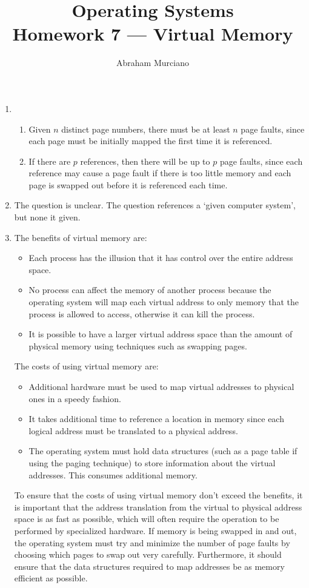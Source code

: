 \documentclass[fleqn]{article}
\title{Operating Systems \\
\medskip
\large Homework 7 --- Virtual Memory}
\author{Abraham Murciano}
\newenvironment{answers}{ %
	\begin{enumerate}
		\setlength{\itemsep}{\bigskipamount}
}{	\end{enumerate}	}
\begin{document}
\maketitle

\begin{answers}
	\item %
	\begin{enumerate}
		\item %
		Given \(n\) distinct page numbers, there must be at least \(n\) page faults, since each page must be initially mapped the first time it is referenced.

		\item %
		If there are \(p\) references, then there will be up to \(p\) page faults, since each reference may cause a page fault if there is too little memory and each page is swapped out before it is referenced each time.
	\end{enumerate}

	\item %
	The question is unclear. The question references a `given computer system', but none it given.

	\item %
	The benefits of virtual memory are:
	\begin{itemize}
		\item Each process has the illusion that it has control over the entire address space.
		\item No process can affect the memory of another process because the operating system will map each virtual address to only memory that the process is allowed to access, otherwise it can kill the process.
		\item It is possible to have a larger virtual address space than the amount of physical memory using techniques such as swapping pages.
	\end{itemize}
	The costs of using virtual memory are:
	\begin{itemize}
		\item Additional hardware must be used to map virtual addresses to physical ones in a speedy fashion.
		\item It takes additional time to reference a location in memory since each logical address must be translated to a physical address.
		\item The operating system must hold data structures (such as a page table if using the paging technique) to store information about the virtual addresses. This consumes additional memory.
	\end{itemize}
	To ensure that the costs of using virtual memory don't exceed the benefits, it is important that the address translation from the virtual to physical address space is as fast as possible, which will often require the operation to be performed by specialized hardware. If memory is being swapped in and out, the operating system must try and minimize the number of page faults by choosing which pages to swap out very carefully. Furthermore, it should ensure that the data structures required to map addresses be as memory efficient as possible.


\end{answers}
\end{document}
